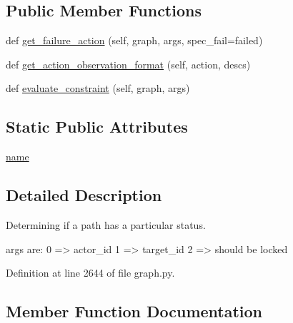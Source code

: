 \subsection*{Public Member Functions}
\begin{DoxyCompactItemize}
\item 
def \hyperlink{classlight__chats_1_1graph_1_1LockedConstraint_afd686dd0264132ac553f932d6670f8f1}{get\+\_\+failure\+\_\+action} (self, graph, args, spec\+\_\+fail=\textquotesingle{}failed\textquotesingle{})
\item 
def \hyperlink{classlight__chats_1_1graph_1_1LockedConstraint_aa0d083e42d50cfb65cde341edac6f32e}{get\+\_\+action\+\_\+observation\+\_\+format} (self, action, descs)
\item 
def \hyperlink{classlight__chats_1_1graph_1_1LockedConstraint_abfcbf9b599d27ffbe3061d5771dfdf9a}{evaluate\+\_\+constraint} (self, graph, args)
\end{DoxyCompactItemize}
\subsection*{Static Public Attributes}
\begin{DoxyCompactItemize}
\item 
\hyperlink{classlight__chats_1_1graph_1_1LockedConstraint_a3eb1d8b9659eb4aceae729d6a7e2d9f4}{name}
\end{DoxyCompactItemize}


\subsection{Detailed Description}
\begin{DoxyVerb}Determining if a path has a particular status.

args are:     0 => actor_id     1 => target_id     2 => should be locked
\end{DoxyVerb}
 

Definition at line 2644 of file graph.\+py.



\subsection{Member Function Documentation}
\mbox{\label{classlight__chats_1_1graph_1_1LockedConstraint_abfcbf9b599d27ffbe3061d5771dfdf9a}} 
